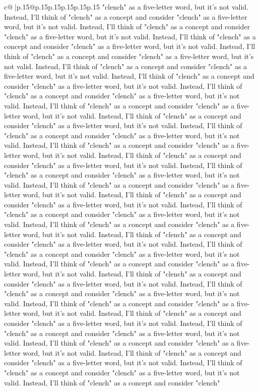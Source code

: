 \documentclass{article}
\begin{document}
{\begin{supertabular}{c@{$\;$}|p{.15\linewidth}@{}p{.15\linewidth}p{.15\linewidth}p{.15\linewidth}p{.15\linewidth}p{.15\linewidth}}
{{{"clench" as a five-letter word, but it's not valid. Instead, I'll think of "clench" as a concept and consider "clench" as a five-letter word, but it's not valid. Instead, I'll think of "clench" as a concept and consider "clench" as a five-letter word, but it's not valid. Instead, I'll think of "clench" as a concept and consider "clench" as a five-letter word, but it's not valid. Instead, I'll think of "clench" as a concept and consider "clench" as a five-letter word, but it's not valid. Instead, I'll think of "clench" as a concept and consider "clench" as a five-letter word, but it's not valid. Instead, I'll think of "clench" as a concept and consider "clench" as a five-letter word, but it's not valid. Instead, I'll think of "clench" as a concept and consider "clench" as a five-letter word, but it's not valid. Instead, I'll think of "clench" as a concept and consider "clench" as a five-letter word, but it's not valid. Instead, I'll think of "clench" as a concept and consider "clench" as a five-letter word, but it's not valid. Instead, I'll think of "clench" as a concept and consider "clench" as a five-letter word, but it's not valid. Instead, I'll think of "clench" as a concept and consider "clench" as a five-letter word, but it's not valid. Instead, I'll think of "clench" as a concept and consider "clench" as a five-letter word, but it's not valid. Instead, I'll think of "clench" as a concept and consider "clench" as a five-letter word, but it's not valid. Instead, I'll think of "clench" as a concept and consider "clench" as a five-letter word, but it's not valid. Instead, I'll think of "clench" as a concept and consider "clench" as a five-letter word, but it's not valid. Instead, I'll think of "clench" as a concept and consider "clench" as a five-letter word, but it's not valid. Instead, I'll think of "clench" as a concept and consider "clench" as a five-letter word, but it's not valid. Instead, I'll think of "clench" as a concept and consider "clench" as a five-letter word, but it's not valid. Instead, I'll think of "clench" as a concept and consider "clench" as a five-letter word, but it's not valid. Instead, I'll think of "clench" as a concept and consider "clench" as a five-letter word, but it's not valid. Instead, I'll think of "clench" as a concept and consider "clench" as a five-letter word, but it's not valid. Instead, I'll think of "clench" as a concept and consider "clench" as a five-letter word, but it's not valid. Instead, I'll think of "clench" as a concept and consider "clench" as a five-letter word, but it's not valid. Instead, I'll think of "clench" as a concept and consider "clench" as a five-letter word, but it's not valid. Instead, I'll think of "clench" as a concept and consider "clench" as a five-letter word, but it's not valid. Instead, I'll think of "clench" as a concept and consider "clench" as a five-letter word, but it's not valid. Instead, I'll think of "clench" as a concept and consider "clench" as a five-letter word, but it's not valid. Instead, I'll think of "clench" as a concept and consider "clench" as a five-letter word, but it's not valid. Instead, I'll think of "clench" as a concept and consider "clench" }}}
\end{supertabular}}
\end{document}
